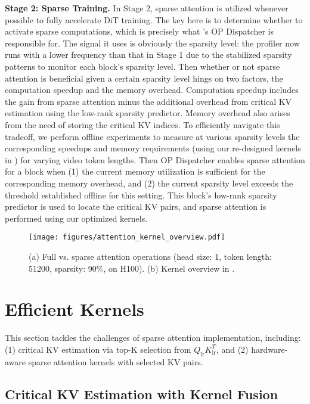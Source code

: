 \noindent\textbf{Stage 2: Sparse Training.}
In Stage 2, sparse attention is utilized whenever possible to fully accelerate DiT training. 
The key here is to determine whether to activate sparse computations, which is precisely what \sys's OP Dispatcher is responsible for. 
The signal it uses is obviously the sparsity level: the profiler now runs with a lower frequency than that in Stage 1 due to the stabilized sparsity patterns to monitor each block's sparsity level.
Then whether or not sparse attention is beneficial given a certain sparsity level hings on two factors, the computation speedup and the memory overhead.
Computation speedup includes the gain from sparse attention minus the additional overhead from critical KV estimation using the low-rank sparsity predictor.
Memory overhead also arises from the need of storing the critical KV indices.
To efficiently navigate this tradeoff, we perform offline experiments to measure at various sparsity levels the corresponding speedups and memory requirements (using our re-designed kernels in ) for varying video token lengths.
Then OP Dispatcher enables sparse attention for a block when (1) the current memory utilization is sufficient for the corresponding memory overhead, and (2) the current sparsity level exceeds the threshold established offline for this setting.
This block's low-rank sparsity predictor is used to locate the critical KV pairs, and sparse attention is performed using our optimized kernels. 





\begin{figure}[t]
  \centering
  \texttt{[image: figures/attention\_kernel\_overview.pdf]} 
    \caption{(a) Full vs. sparse attention operations (head size: 1, token length: 51200, sparsity: 90\%, on H100). (b) Kernel overview in \sys.}
  \label{fig:atten_kernel_overview} 
\end{figure}



\section{Efficient Kernels}
\label{sec:kernels}
This section tackles the challenges of sparse attention implementation, including: (1) critical KV estimation via top-K selection from $Q_{\text{lr}}K_{\text{lr}}^T$, and (2) hardware-aware sparse attention kernels with selected KV pairs. 

\subsection{Critical KV Estimation with Kernel Fusion}
\label{sec:estimation_kernel}

